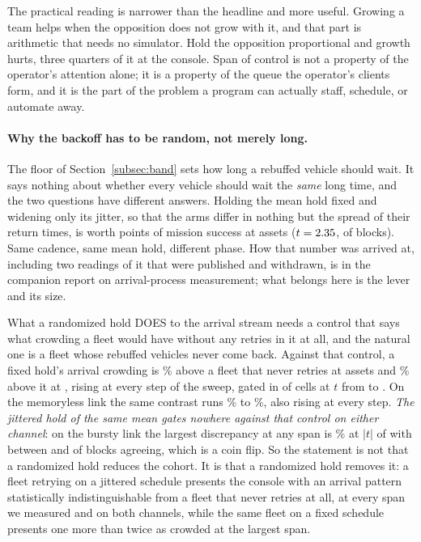 \documentclass[11pt]{article}
\begin{document}
The practical reading is narrower than the headline and more useful. Growing a team helps when the opposition does not grow with it, and that part is arithmetic that needs no simulator. Hold the opposition proportional and growth hurts, three quarters of it at the console. Span of control is not a property of the operator's attention alone; it is a property of the queue the operator's clients form, and it is the part of the problem a program can actually staff, schedule, or automate away.

\paragraph{Why the backoff has to be random, not merely long.} The floor of Section~\ref{subsec:band} sets how long a rebuffed vehicle should wait. It says nothing about whether every vehicle should wait the \emph{same} long time, and the two questions have different answers. Holding the mean hold fixed and widening only its jitter, so that the arms differ in nothing but the spread of their return times, is worth \jcSuccBest{} points of mission success at \jcSuccSpanNum{} assets ($t = 2.35{}$, \jcSuccBestBlocks{} of \jcSuccBestN{} blocks). Same cadence, same mean hold, different phase. How that number was arrived at, including two readings of it that were published and withdrawn, is in the companion report on arrival-process measurement; what belongs here is the lever and its size.

What a randomized hold DOES to the arrival stream needs a control that says what crowding a fleet would have without any retries in it at all, and the natural one is a fleet whose rebuffed vehicles never come back. Against that control, a fixed hold's arrival crowding is \nrGeFixLoPct\% above a fleet that never retries at \nrGeSpanLo{} assets and \nrGeFixHiPct\% above it at \nrGeSpanHi{}, rising at every step of the sweep, gated in \nrGeFixGated{} of \nrGeFixCells{} cells at $t$ from \nrGeFixMinT{} to \nrGeFixMaxT{}. On the memoryless link the same contrast runs \nrMemFixLoPct\% to \nrMemFixHiPct\%, also rising at every step. \emph{The jittered hold of the same mean gates nowhere against that control on either channel}: on the bursty link the largest discrepancy at any span is \nrGeJitMaxPct\% at $|t|$ of \nrGeJitMaxT{} with between \nrGeJitMinBlocks{} and \nrGeJitMaxBlocks{} of \nrGeBlocks{} blocks agreeing, which is a coin flip. So the statement is not that a randomized hold reduces the cohort. It is that a randomized hold removes it: a fleet retrying on a jittered schedule presents the console with an arrival pattern statistically indistinguishable from a fleet that never retries at all, at every span we measured and on both channels, while the same fleet on a fixed schedule presents one more than twice as crowded at the largest span.
\end{document}
